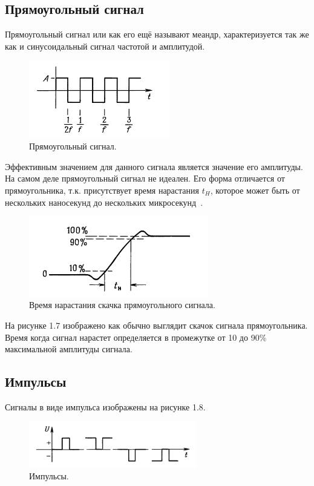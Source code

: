 \subsection{Прямоугольный сигнал}
	Прямоугольный сигнал или как его ещё называют меандр, характеризуется так же как и синусоидальный сигнал частотой и амплитудой.
	\begin{figure}[H]
    \centering
    \includegraphics[width=0.55\textwidth]{../image/s_p.png}
    \caption{Прямоугольный сигнал.}
	\end{figure}

	Эффективным значением для данного сигнала является значение его амплитуды. На самом деле прямоугольный сигнал не идеален. Его форма отличается от прямоугольника, т.к. присутствует время нарастания $t_{H}$, которое может быть от нескольких наносекунд до нескольких микросекунд~\cite{is1}.

	\begin{figure}[H]
    \centering
    \includegraphics[width=0.7\textwidth]{../image/s_p_t.png}
    \caption{Время нарастания скачка прямоугольного сигнала.}
	\end{figure}
	
	На рисунке 1.7 изображено как обычно выглядит скачок сигнала прямоугольника. Время когда сигнал нарастет определяется в промежутке от 10 до 90\% максимальной амплитуды сигнала.

\subsection{Импульсы}
Сигналы в виде импульса изображены на рисунке 1.8.

	\begin{figure}[H]
    \centering
    \includegraphics[width=0.65\textwidth]{../image/s_i.png}
    \caption{Импульсы.}
	\end{figure}
	
